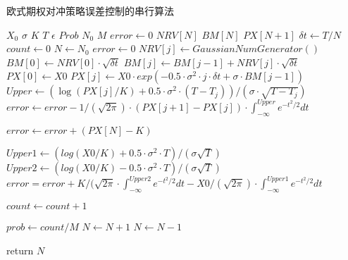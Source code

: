 \begin{algorithm}
  \caption{欧式期权对冲策略误差控制的串行算法}
  \label{alg:bserror}
	\begin{algorithmic}[1]
	 \Require $X_0$ 
	 \Require $\sigma$ 
	 \Require $K$ 
	 \Require $T$ 
	 \Require $\epsilon$ 
	 \Require $Prob$ 
         \Require $N_{0}$ 
         \Require $M$ 
         \State $error \gets 0$ 
         \State $NRV[N]$ 
         \State $BM[N]$ 
         \State $PX[N+1]$ 
	 \State $\delta t \gets T/N$ 
	 \State $count \gets 0$ 
         \State $N \gets N_0$
	   
          \State $error \gets 0$ 
	     $NRV[j] \gets GaussianNumGenerator()$
	  \EndFor
	  \State $BM[0] \gets NRV[0] \cdot \sqrt{\delta t}$ 
	     $BM[j] \gets BM[j-1] + NRV[j]\cdot \sqrt{\delta t}$ 
	  \EndFor
	  \State $PX[0] \gets X0$
	  \State $PX[j]\gets X0 \cdot exp(-0.5\cdot \sigma^2 \cdot j \cdot \delta t + \sigma \cdot BM[j-1])$
	  \EndFor
	  \State $Upper \gets (\log(PX[j]/K) + 0.5\cdot \sigma^2 \cdot (T- T_j))/ (\sigma \cdot \sqrt{T-T_j})$ 
	  \State $error \gets error - 1/(\sqrt{2\pi}) \cdot (PX[j+1]-PX[j])\cdot \int_{-\infty}^{Upper}e^{-t^2/2}dt $
	  \EndFor

	  \State $error \gets error + (PX[N]-K)$
	  \EndIf

	  \State $Upper1 \gets (log(X0/K) + 0.5\cdot \sigma^2 \cdot T)/(\sigma \sqrt{T})$
	  \State $Upper2 \gets (log(X0/K) - 0.5\cdot \sigma^2 \cdot T)/(\sigma \sqrt{T})$
	  \State $error = error + K/(\sqrt{2\pi} \cdot \int_{-\infty}^{Upper2}e^{-t^2/2}dt -X0/(\sqrt{2\pi})\cdot \int_{-\infty}^{Upper1}e^{-t^2/2}dt$
	  
	  \State $count \gets count + 1$ 
	  \EndIf
	  \EndFor

	  \State $prob \gets count/M$
	  \State $N \gets N + 1$
	  \Else
	  \State $N \gets N - 1$
	  \EndIf

	  \State return $N$
	 \EndProcedure
  \end{algorithmic}
\end{algorithm}






